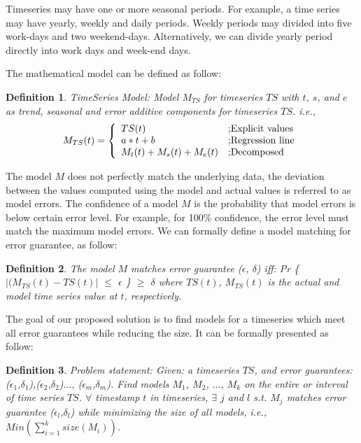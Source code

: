 \documentclass{sigmod}
\newtheorem{mydef}{Definition}
\begin{document}
Timeseries may have one or more seasonal periods. For example, a time series may have  yearly, weekly and daily periods. Weekly periods may divided into five work-days and two weekend-days. Alternatively, we can  divide yearly period directly into work days and week-end days.
 
The mathematical model can be defined as follow:
\begin{mydef} TimeSeries Model: Model $M_{TS}$ for timeseries $TS$ with  $t$, $s$, and $e$ as trend, seasonal and error additive components for timeseries $TS$. i.e.,   
\[
  M_{TS}(t) = \left\{ 
  \begin{array}{l l}
    TS (t) &  \text{;Explicit values}
    \\
    a*t+b             & \text{;Regression line} \\
    M_{t}(t)+M_{s}(t)+M_{e}(t) &  \text{;Decomposed}\\
  \end{array} \right.
\]
\end{mydef}

The model $M$ does not perfectly match the underlying data, the deviation between the values computed using the model  and actual values is referred to as model errors. The confidence of a model $M$ is the probability that model errors is below certain error level. For example, for 100\% confidence, the error level must match the maximum model errors. We can formally define a  model matching for  error guarantee, as follow:
\begin{mydef} The model $M$ matches error guarantee ($\epsilon$, $\delta$) iff: 
Pr \{ $|(M_{TS}(t) - TS(t)|$ $\leq$ $\epsilon$ \} $\geq$ $\delta$ where $TS(t)$, $M_{TS}(t)$ is the actual and model time series value at $t$, respectively.
\end{mydef}

The goal of our proposed solution is to find models for a timeseries which meet all error guarantees while reducing the size. It can be formally presented as follow:
\begin{mydef} Problem statement: Given: a timeseries $TS$, and error guarantees: ($\epsilon_1$,$\delta_1$),($\epsilon_2$,$\delta_2$)$\dots$, ($\epsilon_m$,$\delta_m$). Find models $M_1$, $M_2$, $\dots$, $M_k$ on the entire or interval of time series $TS$. 
$\forall$ timestamp $t$ in timeseries,  $\exists$ $j$ and $l$ s.t. $M_j$ matches error guarantee ($\epsilon_l$,$\delta_l$) while minimizing the size of all models, i.e.,  $Min(\sum^k_{i=1}{size(M_i)})$.
\end{mydef}
\end{document}
